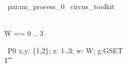 
\begin{zsection}
  \SECTION\ param\_process\_0 \parents\ circus\_toolkit
\end{zsection}

\begin{zed}
    [GSET] \\
	W == 0 .. 3 
\end{zed}

\begin{circus}
    \circprocess\ P0 \circdef  x,y: \{1,2\}; z: 1..3; w: W; g:GSET \circspot \circbegin  \\
        \t1 \circspot \Skip \\
    \circend
\end{circus}

